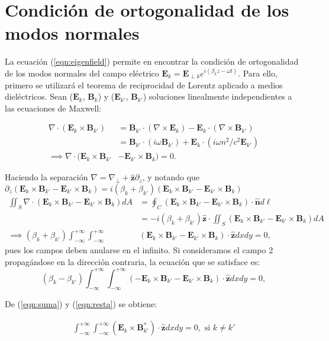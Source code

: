 \chapter{Condición de ortogonalidad de los modos normales \label{sec:orto}}

La ecuación (\ref{eqn:eigenfield}) permite en encontrar la condición de ortogonalidad de los modos normales del campo eléctrico  $\textbf{E}_k = \textbf{E}_{\perp k}e^{i(\beta_k z - \omega t)}$. Para ello, primero se utilizará el teorema de reciprocidad de Lorentz aplicado a medios dieléctricos. Sean ($\textbf{E}_k$, $\textbf{B}_{k}$) y ($\textbf{E}_{k'}$, $\textbf{B}_{k'}$) soluciones linealmente independientes a las ecuaciones de Maxwell:

\begin{align*}
	\nabla\cdot(\textbf{E}_k\times \textbf{B}_{k'}) &= \textbf{B}_{k'}\cdot(\nabla\times \textbf{E}_k)   - \textbf{E}_k\cdot(\nabla\times\textbf{B}_{k'}) 
\\	
	&= \textbf{B}_{k'}\cdot(i\omega\textbf{B}_{k'})   + \textbf{E}_k\cdot(i\omega n^2/c^2 \textbf{E}_{k'})
	\\
	\implies \nabla\cdot(\textbf{E}_k\times \textbf{B}_{k'} &- \textbf{E}_{k'}\times \textbf{B}_{k}) = 0.
\end{align*}

Haciendo la separación $\nabla = \nabla_\perp + \hat{\textbf{z}}\partial_z$, y notando que $\partial_z (\textbf{E}_k\times \textbf{B}_{k'} - \textbf{E}_{k'}\times \textbf{B}_{k}) =i(\beta_k+\beta_{k'})(\textbf{E}_k\times \textbf{B}_{k'} - \textbf{E}_{k'}\times \textbf{B}_{k}) $
\begin{align}
	\iint_S \nabla\cdot(\textbf{E}_k\times \textbf{B}_{k'} - \textbf{E}_{k'}\times \textbf{B}_{k}) dA
	&= \oint_C (\textbf{E}_k\times \textbf{B}_{k'} - \textbf{E}_{k'}\times \textbf{B}_{k})
	\cdot\hat{\textbf{n}} d\ell \nonumber
	\\
	&=
	- i(\beta_k+\beta_{k'})\hat{\textbf{z}}\cdot\iint_S(\textbf{E}_k\times \textbf{B}_{k'} - \textbf{E}_{k'}\times \textbf{B}_{k})dA \nonumber
	\\
	\implies 
	(\beta_k+\beta_{k'})\int_{-\infty}^{+\infty}\int_{-\infty}^{+\infty}&(\textbf{E}_k\times \textbf{B}_{k'} - \textbf{E}_{k'}\times \textbf{B}_{k})\cdot \hat{\textbf{z}} dxdy = 0, \label{eqn:suma}
\end{align}
pues los campos deben anularse en el infinito. Si consideramos el campo 2 propagándose en la dirección contraria, la ecuación que se satisface es:
\begin{equation}
	(\beta_k-\beta_{k'})\int_{-\infty}^{+\infty}\int_{-\infty}^{+\infty}(-\textbf{E}_k\times \textbf{B}_{k'} - \textbf{E}_{k'}\times \textbf{B}_{k})\cdot \hat{\textbf{z}} dxdy = 0, \label{eqn:resta}
\end{equation}

De (\ref{eqn:suma}) y (\ref{eqn:resta}) se obtiene:

\begin{align}
	 \int_{-\infty}^{+\infty}\int_{-\infty}^{+\infty}(\textbf{E}_k\times \textbf{B}^*_{k'})\cdot \hat{\textbf{z}} dxdy = 0, \text{ si } k\neq k'
\end{align}